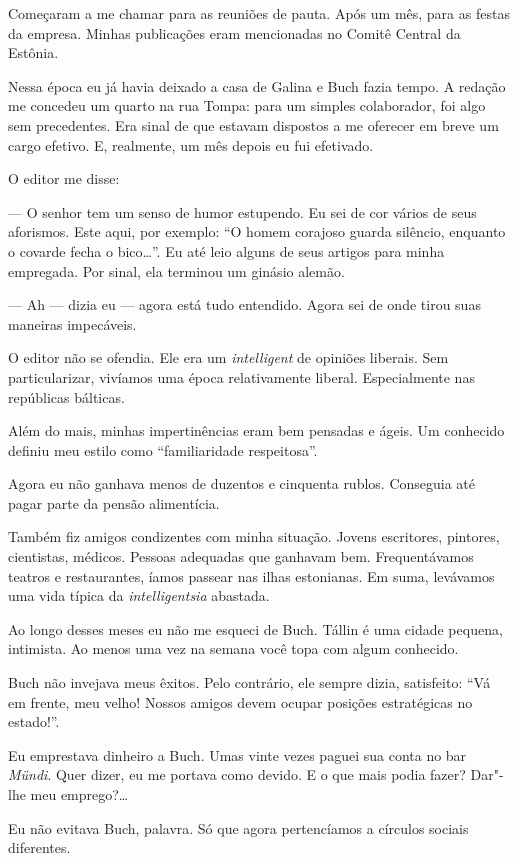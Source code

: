 Começaram a me chamar para as reuniões de pauta. Após um mês, para as
festas da empresa. Minhas publicações eram mencionadas no Comitê Central
da Estônia.

Nessa época eu já havia deixado a casa de Galina e Buch fazia tempo. A
redação me concedeu um quarto na rua Tompa: para um simples colaborador,
foi algo sem precedentes. Era sinal de que estavam dispostos a me
oferecer em breve um cargo efetivo. E, realmente, um mês depois eu fui
efetivado.

O editor me disse:

--- O senhor tem um senso de humor estupendo. Eu sei de cor vários de
seus aforismos. Este aqui, por exemplo: ``O homem corajoso guarda
silêncio, enquanto o covarde fecha o bico\ldots{}''. Eu até leio alguns de
seus artigos para minha empregada. Por sinal, ela terminou um ginásio
alemão.

--- Ah --- dizia eu --- agora está tudo entendido. Agora sei de onde
tirou suas maneiras impecáveis.

O editor não se ofendia. Ele era um \emph{intelligent} de opiniões
liberais. Sem particularizar, vivíamos uma época relativamente liberal.
Especialmente nas repúblicas bálticas.

Além do mais, minhas impertinências eram bem pensadas e ágeis. Um
conhecido definiu meu estilo como ``familiaridade respeitosa''.

Agora eu não ganhava menos de duzentos e cinquenta rublos. Conseguia até
pagar parte da pensão alimentícia.

Também fiz amigos condizentes com minha situação. Jovens escritores,
pintores, cientistas, médicos. Pessoas adequadas que ganhavam bem.
Frequentávamos teatros e restaurantes, íamos passear nas ilhas
estonianas. Em suma, levávamos uma vida típica da \emph{intelligentsia}
abastada.

Ao longo desses meses eu não me esqueci de Buch. Tállin é uma cidade
pequena, intimista. Ao menos uma vez na semana você topa com algum
conhecido.

Buch não invejava meus êxitos. Pelo contrário, ele sempre dizia,
satisfeito: ``Vá em frente, meu velho! Nossos amigos devem ocupar
posições estratégicas no estado!''.

Eu emprestava dinheiro a Buch. Umas vinte vezes paguei sua conta no bar
\emph{Mündi}. Quer dizer, eu me portava como devido. E o que mais podia
fazer? Dar"-lhe meu emprego?\ldots{}

Eu não evitava Buch, palavra. Só que agora pertencíamos a círculos
sociais diferentes.

